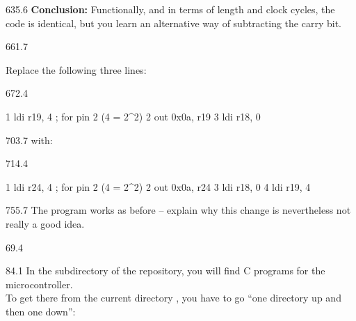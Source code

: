 \documentclass{aslab}
\makeatletter
\newcommand*\aN[1]{\textcolor{codeorange}{#1}}%
\newcommand*\aI[1]{\textcolor{codegreen}{#1}}%
\newcommand*\aK[1]{\textcolor{codered}{#1}}%
\newcommand*\aR[1]{\textcolor{codecyan}{#1}}%
\newcommand*\aC[1]{\textcolor{codepurple}{#1}}%
\newenvironment{asmlisting}[1][11]{\par
  \edef\asm@bs{\the\baselineskip}\fontsize{#1bp}{\asm@bs}\selectfont
  \ttfamily\asm@setup}{\par}
\makeatother
\begin{document}
\begin{region}[x=74.7,right=0,pitch=12.1]{635.6}
\textbf{Conclusion:} Functionally, and in terms of length and clock cycles,
the code is identical, but you learn an alternative way of subtracting the
carry bit.
\end{region}

\begin{region}{661.7}
\begin{numlist}[start=3]
\item Replace the following three lines:
\end{numlist}
\end{region}

\begin{region}[x=74.7,right=0,pitch=10]{672.4}
\begin{asmlisting}[9]
\aN{1}         \aI{ldi}     \aR{r19},    \aK{4}           \aC{; for pin 2 (4 = 2\textasciicircum{}2)}
\aN{2}         \aI{out}     \aK{0x0a},   \aR{r19}
\aN{3}         \aI{ldi}     \aR{r18},    \aK{0}
\end{asmlisting}
\end{region}

\begin{region}[x=74.7,right=0]{703.7}
with:
\end{region}

\begin{region}[x=74.7,right=0,pitch=10]{714.4}
\begin{asmlisting}[9]
\aN{1}         \aI{ldi}     \aR{r24},    \aK{4}           \aC{; for pin 2 (4 = 2\textasciicircum{}2)}
\aN{2}         \aI{out}     \aK{0x0a},   \aR{r24}
\aN{3}         \aI{ldi}     \aR{r18},    \aK{0}
\aN{4}         \aI{ldi}     \aR{r19},    \aK{4}
\end{asmlisting}
\end{region}

\begin{region}[x=74.7,right=0]{755.7}
The program works as before -- explain why this change is nevertheless
not really a good idea.
\end{region}

\nextpage
\begin{region}[x=57.9,right=0]{69.4}
\end{region}

\begin{region}[pitch=13.4]{84.1}
In the subdirectory  of the repository, you will find C programs for
the microcontroller.\\
To get there from the current directory , you have to go ``one
directory up and then one down'':
\end{region}
\end{document}
